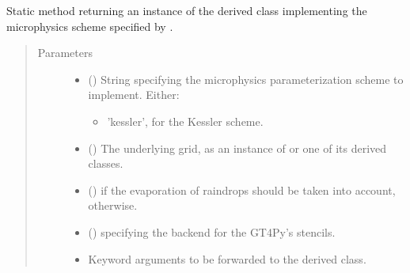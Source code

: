 \documentclass[letterpaper,10pt,english]{sphinxmanual}
\begin{document}
\begin{fulllineitems}
\begin{fulllineitems}
\begin{quote}
\begin{description}
\begin{itemize}
\end{itemize}

\end{description}\end{quote}

\end{fulllineitems}


\begin{fulllineitems}
\label{\detokenize{api:parameterizations.adjustment_microphysics.AdjustmentMicrophysics.factory}}
Static method returning an instance of the derived class implementing the microphysics scheme
specified by .
\begin{quote}\begin{description}
\item[{Parameters}] \leavevmode\begin{itemize}
\item {} 
 () \textendash{} 
String specifying the microphysics parameterization scheme to implement. Either:
\begin{itemize}
\item {} 
’kessler’, for the Kessler scheme.

\end{itemize}


\item {} 
 () \textendash{} The underlying grid, as an instance of {\hyperref[\detokenize{api:grids.grid_xyz.GridXYZ}]{}} or one of its derived classes.

\item {} 
 () \textendash{}  if the evaporation of raindrops should be taken into account,  otherwise.

\item {} 
 () \textendash{}  specifying the backend for the GT4Py’s stencils.

\item {} 
 \textendash{} Keyword arguments to be forwarded to the derived class.


\end{itemize}
\end{description}
\end{quote}
\end{fulllineitems}
\end{fulllineitems}
\end{document}
